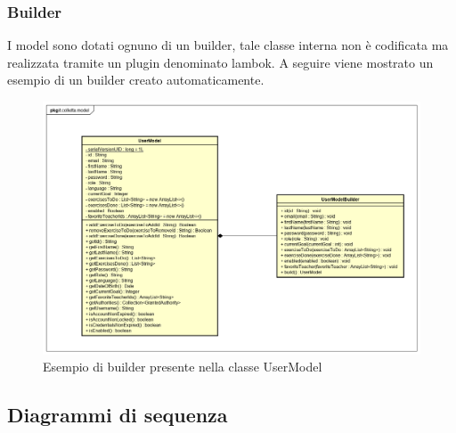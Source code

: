 \subsubsection{Builder}
I model sono dotati ognuno di un builder, tale classe interna non è codificata ma realizzata tramite un plugin denominato lambok. A seguire viene mostrato un esempio di un builder creato automaticamente.
\begin{figure}[H]
\centering
\includegraphics[width=15cm]{img/builder.png}
\caption{Esempio di builder presente nella classe UserModel}
\end{figure}


\newpage
\subsection{Diagrammi di sequenza}



